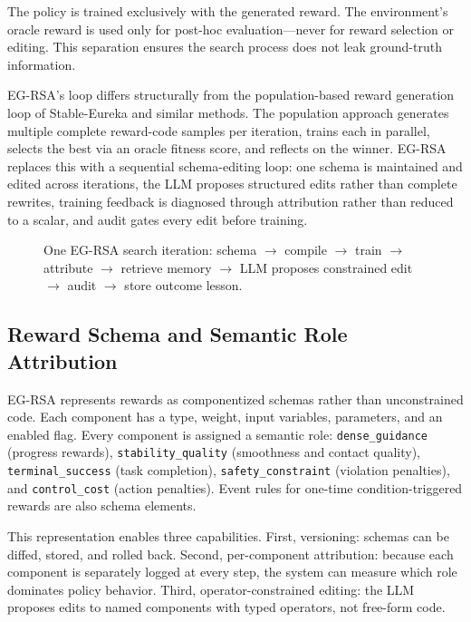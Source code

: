 \documentclass[11pt]{article}
\begin{document}
The policy is trained exclusively with the generated reward. The environment's oracle reward is used only for post-hoc evaluation---never for reward selection or editing. This separation ensures the search process does not leak ground-truth information.

EG-RSA's loop differs structurally from the population-based reward generation loop of Stable-Eureka and similar methods. The population approach generates multiple complete reward-code samples per iteration, trains each in parallel, selects the best via an oracle fitness score, and reflects on the winner. EG-RSA replaces this with a sequential schema-editing loop: one schema is maintained and edited across iterations, the LLM proposes structured edits rather than complete rewrites, training feedback is diagnosed through attribution rather than reduced to a scalar, and audit gates every edit before training.

\begin{figure}[t]
    \centering
    \caption{One EG-RSA search iteration: schema $\rightarrow$ compile $\rightarrow$ train $\rightarrow$ attribute $\rightarrow$ retrieve memory $\rightarrow$ LLM proposes constrained edit $\rightarrow$ audit $\rightarrow$ store outcome lesson.}
    \label{fig:loop}
\end{figure}

\subsection{Reward Schema and Semantic Role Attribution}

EG-RSA represents rewards as componentized schemas rather than unconstrained code. Each component has a type, weight, input variables, parameters, and an enabled flag. Every component is assigned a semantic role: \texttt{dense\_guidance} (progress rewards), \texttt{stability\_quality} (smoothness and contact quality), \texttt{terminal\_success} (task completion), \texttt{safety\_constraint} (violation penalties), and \texttt{control\_cost} (action penalties). Event rules for one-time condition-triggered rewards are also schema elements.

This representation enables three capabilities. First, versioning: schemas can be diffed, stored, and rolled back. Second, per-component attribution: because each component is separately logged at every step, the system can measure which role dominates policy behavior. Third, operator-constrained editing: the LLM proposes edits to named components with typed operators, not free-form code.
\end{document}
